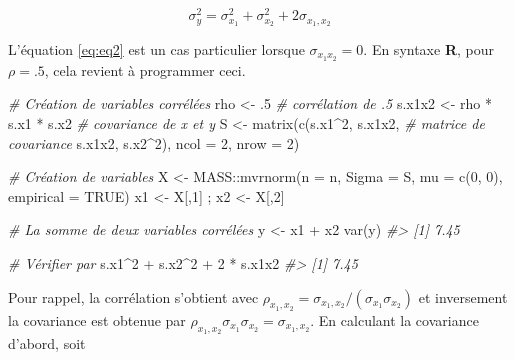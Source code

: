 \documentclass[
]{book}
\newenvironment{Shaded}{}{}
\newcommand{\AttributeTok}[1]{#1}
\newcommand{\CommentTok}[1]{\textit{#1}}
\newcommand{\ConstantTok}[1]{#1}
\newcommand{\DecValTok}[1]{#1}
\newcommand{\FunctionTok}[1]{#1}
\newcommand{\NormalTok}[1]{#1}
\newcommand{\OtherTok}[1]{#1}
\newcommand{\SpecialCharTok}[1]{#1}
\begin{document}
\begin{equation}
\sigma_y^2=\sigma_{x_1}^2+\sigma_{x_2}^2+2\sigma_{x_1,x_2}
\label{eq:eq3}
\end{equation}

L'équation \eqref{eq:eq2} est un cas particulier lorsque \(\sigma_{x_1 x_2}=0\). En syntaxe \textbf{R}, pour \(\rho = .5\), cela revient à programmer ceci.

\begin{Shaded}
\begin{Highlighting}[]
\CommentTok{\# Création de variables corrélées}
\NormalTok{rho }\OtherTok{\textless{}{-}}\NormalTok{ .}\DecValTok{5}                          \CommentTok{\# corrélation de .5}
\NormalTok{s.x1x2 }\OtherTok{\textless{}{-}}\NormalTok{ rho }\SpecialCharTok{*}\NormalTok{ s.x1 }\SpecialCharTok{*}\NormalTok{ s.x2        }\CommentTok{\# covariance de x et y}
\NormalTok{S }\OtherTok{\textless{}{-}} \FunctionTok{matrix}\NormalTok{(}\FunctionTok{c}\NormalTok{(s.x1}\SpecialCharTok{\^{}}\DecValTok{2}\NormalTok{, s.x1x2,      }\CommentTok{\# matrice de covariance}
\NormalTok{             s.x1x2, s.x2}\SpecialCharTok{\^{}}\DecValTok{2}\NormalTok{), }\AttributeTok{ncol =}  \DecValTok{2}\NormalTok{, }\AttributeTok{nrow =} \DecValTok{2}\NormalTok{)}

\CommentTok{\# Création de variables}
\NormalTok{X }\OtherTok{\textless{}{-}}\NormalTok{ MASS}\SpecialCharTok{::}\FunctionTok{mvrnorm}\NormalTok{(}\AttributeTok{n =}\NormalTok{ n, }\AttributeTok{Sigma =}\NormalTok{ S, }\AttributeTok{mu =} \FunctionTok{c}\NormalTok{(}\DecValTok{0}\NormalTok{, }\DecValTok{0}\NormalTok{), }\AttributeTok{empirical =} \ConstantTok{TRUE}\NormalTok{)}
\NormalTok{x1 }\OtherTok{\textless{}{-}}\NormalTok{ X[,}\DecValTok{1}\NormalTok{] ; x2 }\OtherTok{\textless{}{-}}\NormalTok{ X[,}\DecValTok{2}\NormalTok{]}

\CommentTok{\# La somme de deux variables corrélées}
\NormalTok{y }\OtherTok{\textless{}{-}}\NormalTok{ x1 }\SpecialCharTok{+}\NormalTok{ x2}
\FunctionTok{var}\NormalTok{(y)}
\CommentTok{\#\textgreater{} [1] 7.45}

\CommentTok{\# Vérifier par}
\NormalTok{s.x1}\SpecialCharTok{\^{}}\DecValTok{2} \SpecialCharTok{+}\NormalTok{ s.x2}\SpecialCharTok{\^{}}\DecValTok{2} \SpecialCharTok{+} \DecValTok{2} \SpecialCharTok{*}\NormalTok{ s.x1x2}
\CommentTok{\#\textgreater{} [1] 7.45}
\end{Highlighting}
\end{Shaded}

Pour rappel, la corrélation s'obtient avec \(\rho_{x_1,x_2}=\sigma_{x_1,x_2}/(\sigma_{x_1} \sigma_{x_2})\) et inversement la covariance est obtenue par \(\rho_{x_1,x_2} \sigma_{x_1} \sigma_{x_2}=\sigma_{x_1,x_2}\). En calculant la covariance d'abord, soit
\end{document}

